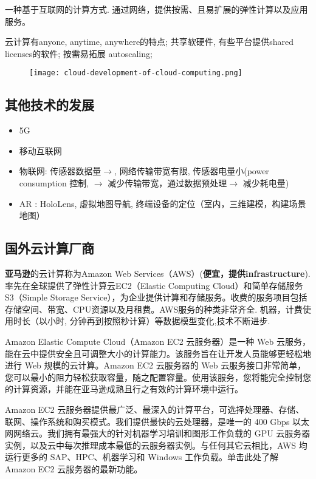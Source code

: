 \begin{definition}[云计算]
    一种基于互联网的计算方式. 通过网络，提供按需、且易扩展的弹性计算以及应用服务。
\end{definition}

云计算有anyone, anytime, anywhere的特点; 共享软硬件, 有些平台提供shared licenses的软件; 按需易拓展 autoscaling; 

\begin{figure}[htbp]
    \centering
    \texttt{[image: cloud-development-of-cloud-computing.png]}
\end{figure}

\subsection{其他技术的发展}

\begin{itemize}
    \item 5G
    \item 移动互联网
    \item 物联网: 传感器数据量$\rightarrow$, 网络传输带宽有限, 传感器电量小(power consumption 控制,  $\rightarrow$ 减少传输带宽，通过数据预处理$\rightarrow$ 减少耗电量)
    \item AR : HoloLens, 虚拟地图导航, 终端设备的定位（室内，三维建模，构建场景地图）
\end{itemize}

\subsection{国外云计算厂商}

\textbf{亚马逊}的云计算称为Amazon Web Services（AWS）(\textbf{便宜，提供infrastructure}).率先在全球提供了弹性计算云EC2（Elastic Computing Cloud）和简单存储服务S3（Simple Storage Service），为企业提供计算和存储服务。收费的服务项目包括存储空间、带宽、CPU资源以及月租费。AWS服务的种类非常齐全. 
机器，计费使用时长（以小时, 分钟再到按照秒计算）等数据模型变化,技术不断进步.

\begin{definition}
    Amazon Elastic Compute Cloud（Amazon EC2 云服务器）是一种 Web 云服务，能在云中提供安全且可调整大小的计算能力。该服务旨在让开发人员能够更轻松地进行 Web 规模的云计算。Amazon EC2 云服务器的 Web 云服务接口非常简单，您可以最小的阻力轻松获取容量，随之配置容量。使用该服务，您将能完全控制您的计算资源，并能在亚马逊成熟且行之有效的计算环境中运行。

    Amazon EC2 云服务器提供最广泛、最深入的计算平台，可选择处理器、存储、联网、操作系统和购买模式。我们提供最快的云处理器，是唯一的 400 Gbps 以太网网络云。我们拥有最强大的针对机器学习培训和图形工作负载的 GPU 云服务器实例，以及云中每次推理成本最低的云服务器实例。与任何其它云相比，AWS 均运行更多的 SAP、HPC、机器学习和 Windows 工作负载。单击此处了解 Amazon EC2 云服务器的最新功能。
\end{definition}

